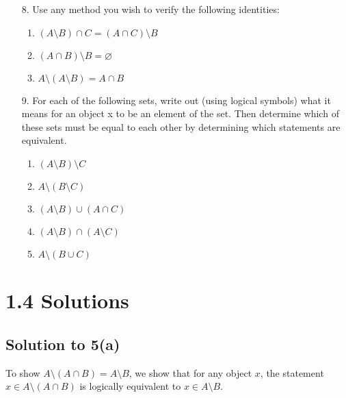 \documentclass{scrartcl}
\begin{document}
\begin{enumerate}[start=5]
        \item[8.] Use any method you wish to verify the following identities:
            \begin{enumerate}
                \item $(A \setminus B) \cap C = (A \cap C) \setminus B$
                \item $(A \cap B) \setminus B = \varnothing$
                \item $A \setminus (A \setminus B) = A \cap B$
            \end{enumerate}
        \item[9.] For each of the following sets, write out (using logical symbols) what it means for an object x to be an element of the set. Then determine which of these sets must be equal to each other by determining which statements are equivalent.
            \begin{enumerate}
                \item $(A \setminus B) \setminus C$
                \item $A \setminus (B \setminus C)$
                \item $(A \setminus B) \cup (A \cap C)$
                \item $(A \setminus B) \cap (A \setminus C)$
                \item $A \setminus (B \cup C)$
            \end{enumerate}
    \end{enumerate}

    \section*{1.4 Solutions}

    \subsection*{Solution to 5(a)}
    To show $A \setminus (A \cap B) = A \setminus B$, we show that for any object $x$, the statement $x \in A \setminus (A \cap B)$ is logically equivalent to $x \in A \setminus B$.
\end{document}
